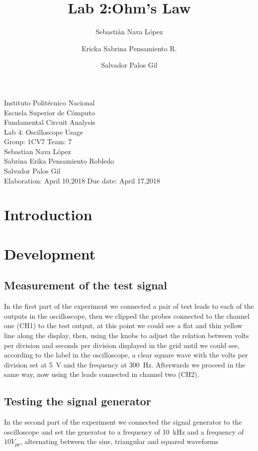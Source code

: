 \documentclass[a4paper]{article}
\title{Lab 2:Ohm's Law}
\author{
    Sebastián Nava López\\
    \and
    Ericka Sabrina Pensamiento R.\\
    \and
    Salvador Palos Gil
}
\begin{document}
\begin{titlepage}
    \centering
    {\Huge Instituto Politécnico Nacional}\\[3ex]
    {\huge Escuela Superior de Cómputo}\\[8ex]
    {\huge Fundamental Circuit Analysis}\\[12ex]
    {\Large Lab 4: Oscilloscope Usage}\\[20ex]
    {\Large Group: 1CV7 Team: 7 \\[8ex]
    Sebastian Nava López\\[4ex]
    Sabrina Erika Pensamiento Robledo\\[4ex]
    Salvador Palos Gil\\[18ex]
    }
    \large{Elaboration: April 10,2018\hspace{8em} Due date: April 17,2018}
\end{titlepage}
\tableofcontents
\newpage
\section{Introduction}
\newpage
\section{Development}
\subsection{Measurement of the test signal}
In the first part of the experiment we connected a pair of test leads to each of the outputs in the
oscilloscope, then we clipped the probes connected to the channel one (CH1) to the test output,
at this point we could see a flat and thin yellow line along the display, then, using the knobs to
adjust the relation between volts per division and seconds per division displayed in the grid until we could see,
according to the label in the oscilloscope, a clear square wave with the volts per division
set at \SI{5}{\volt} and the frequency at \SI{300}{\hertz}. Afterwards we proceed in the same
way, now using the leads connected in channel two (CH2).
\subsection{Testing the signal generator}
In the second part of the experiment we connected the signal generator to the oscilloscope and
set the generator to a frequency of \SI{10}{\kilo\hertz} and a frequency of $10 V_{pp}$,
alternating between the sine, triangular and squared waveforms
\end{document}
